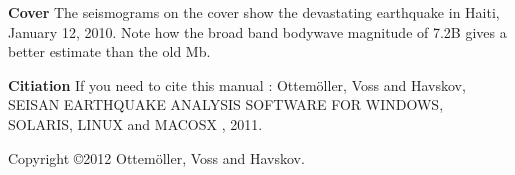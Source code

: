 
\vfill
\vfill
\vfill
\vfill
\vfill
\vfill
\vfill
\vfill

\textbf{Cover}\newline
The seismograms on the cover show the devastating earthquake
in Haiti, January 12, 2010. Note how the broad band bodywave magnitude 
of 7.2B gives a better estimate than the old Mb.

\textbf{Citiation}\newline
If you need to cite this manual : Ottem\"oller, Voss and Havskov, SEISAN 
EARTHQUAKE ANALYSIS SOFTWARE 
FOR WINDOWS, SOLARIS, LINUX and MACOSX 
, 2011.

Copyright \copyright 2012 Ottem\"oller, Voss and Havskov.


